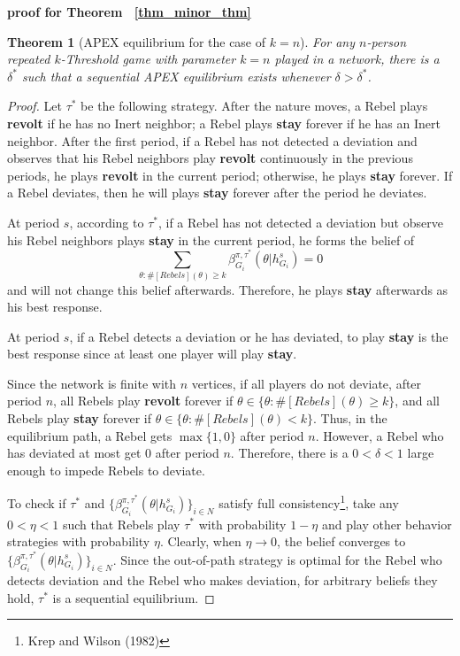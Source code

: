 \documentclass[12pt,letter]{article}
\newtheorem*{theorem*}{Theorem}
\theoremstyle{definition}
\theoremstyle{remark}
\theoremstyle{claim}
\begin{document}
%
%
\bigskip
\noindent\textbf{proof for Theorem ~\ref{thm_minor_thm}}
\begin{theorem*}[APEX equilibrium for the case of $k=n$]
For any $n$-person repeated $k$-Threshold game with parameter $k=n$ played in a network, there is a $\delta^{*}$ such that a sequential APEX equilibrium exists whenever $\delta>
\delta^{*}$.
\end{theorem*}
\begin{proof}
Let $\tau^{*}$ be the following strategy. After the nature moves, a Rebel plays \textbf{revolt} if he has no Inert neighbor; a Rebel plays \textbf{stay} forever if he has an Inert neighbor. After the first period, if a Rebel has not detected a deviation and observes that his Rebel neighbors play \textbf{revolt} continuously in the previous periods, he plays \textbf{revolt} in the current period; otherwise, he plays \textbf{stay} forever. If a Rebel deviates, then he will plays \textbf{stay} forever after the period he deviates.

At period $s$, according to $\tau^{*}$, if a Rebel has not detected a deviation but observe his Rebel neighbors plays \textbf{stay} in the current period, he forms the belief of \[\sum_{\theta:\#[Rebels](\theta)\geq k}\beta^{\pi,\tau^*}_{G_i}(\theta|h^{s}_{G_i})=0\] and will not change this belief afterwards. Therefore, he plays \textbf{stay} afterwards as his best response. 

At period $s$, if a Rebel detects a deviation or he has deviated, to play \textbf{stay} is the best response since at least one player will play \textbf{stay}. 

Since the network is finite with $n$ vertices, if all players do not deviate, after period $n$, all Rebels play \textbf{revolt} forever if $\theta\in \{\theta: \#[Rebels](\theta)\geq k\}$, and all Rebels play \textbf{stay} forever if $\theta\in \{\theta: \#[Rebels](\theta)< k\}$. Thus, in the equilibrium path, a Rebel gets $\max\{1,0\}$ after period $n$. However, a Rebel who has deviated at most get $0$ after period $n$. Therefore, there is a $0<\delta<1$ large enough to impede Rebels to deviate.

To check if $\tau^{*}$ and $\{\beta^{\pi,\tau^*}_{G_i}(\theta|h^{s}_{G_i})\}_{i\in N}$ satisfy full consistency\footnote{Krep and Wilson (1982)}, take any $0<\eta<1$ such that Rebels play $\tau^{*}$ with probability $1-\eta$ and play other behavior strategies with probability $\eta$. Clearly, when $\eta \rightarrow 0$, the belief converges to $\{\beta^{\pi,\tau^*}_{G_i}(\theta|h^{s}_{G_i})\}_{i\in N}$. Since the out-of-path strategy is optimal for the Rebel who detects deviation and the Rebel who makes deviation, for arbitrary beliefs they hold, $\tau^{*}$ is a sequential equilibrium.
\end{proof}
\end{document}
